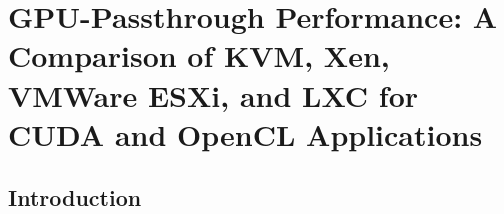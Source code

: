 
\chapter{GPU-Passthrough Performance: A Comparison of KVM, Xen, VMWare ESXi, and LXC for CUDA and OpenCL Applications}
\label{chap:cloud2014}


\begin{comment}
\begin{abstract}
As more scientific workloads are moved into the cloud, the need for high
performance accelerators increases.  Accelerators such as GPUs offer
improvements in both performance and power efficiency over traditional
multi-core processors; however, their use in the cloud has been limited.  Today,
several common hypervisors support GPU-passthrough, but their performance has
not been systematically characterized.  

In this chapter we show that low overhead PCI passthrough is achievable across 4
major hypervisors and two processor microarchitectures. We compare the performance of two generations of NVIDIA
GPUs within the Xen, VMWare ESXi, and KVM hypervisors, and we also compare the
performance to that of Linux Containers (LXC). We show that GPU passthrough to
KVM achieves 98--100\% of the base system's performance across two
architectures, while Xen and VMWare achieve 96--99\% of the base systems
performance, respectively.   In addition, we describe several
valuable lessons learned through our analysis and share the
advantages and disadvantages of each hypervisor/PCI passthrough solution. 

\end{abstract}
\end{comment}
\section{Introduction}


